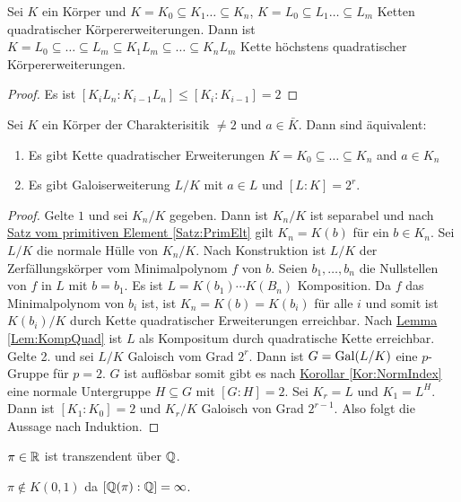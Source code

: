 \begin{Lemma}\label{Lem:KompQuad}
    Sei \(K\) ein Körper und \(K=K_0\subseteq K_1\dots\subseteq K_n\), \(K=L_0\subseteq L_1\dots\subseteq L_m\) Ketten quadratischer Körpererweiterungen.
    Dann ist \(K=L_0\subseteq \dots\subseteq L_m\subseteq K_1L_m\subseteq\dots \subseteq K_nL_m\) Kette höchstens quadratischer Körpererweiterungen.
\end{Lemma}
\begin{proof}
    Es ist \([K_iL_n:K_{i-1}L_n]\leq [K_i:K_{i-1}]=2\)
\end{proof}
\begin{Satz}
    Sei \(K\) ein Körper der Charakterisitik \(\neq 2\) und \(a\in\bar K\). Dann sind äquivalent:
    \begin{enumerate}
        \item Es gibt Kette quadratischer Erweiterungen \(K=K_0\subseteq \dots\subseteq K_n\) and \(a\in K_n\)
        \item Es gibt Galoiserweiterung \(L/K\) mit \(a\in L\) und \([L:K]=2^r\).
    \end{enumerate}
\end{Satz}
\begin{proof}
    Gelte \(1\) und sei \(K_n/K\) gegeben. Dann ist \(K_n/K\) ist separabel und nach \hyperref[Satz:PrimElt]{Satz vom primitiven Element \ref{Satz:PrimElt}} gilt \(K_n=K(b)\) für ein \(b\in K_n\). Sei \(L/K\) die normale Hülle von \(K_n/K\). Nach Konstruktion ist \(L/K\) der Zerfällungskörper vom Minimalpolynom \(f\) von \(b\). Seien \(b_1,\dots,b_n\) die Nullstellen von \(f\) in \(L\) mit \(b=b_1.\) Es ist \(L=K(b_1)\cdots K(B_n)\) Komposition. Da \(f\) das Minimalpolynom von \(b_i\) ist, ist \(K_n=K(b)=K(b_i)\) für alle \(i\) und somit ist \(K(b_i)/K\) durch Kette quadratischer Erweiterungen erreichbar. Nach \hyperref[Lem:KompQuad]{Lemma \ref{Lem:KompQuad}} ist \(L\) als Kompositum durch quadratische Kette erreichbar. Gelte 2. und sei \(L/K\) Galoisch vom Grad \(2^r\). Dann ist \(G=\operatorname{Gal}(L/K)\) eine \(p\)-Gruppe für \(p=2\).
    \(G\) ist auflösbar somit gibt es nach \hyperref[Kor:NormIndex]{Korollar \ref{Kor:NormIndex}} eine normale Untergruppe \(H\subseteq G\) mit \([G:H]=2\).
    Sei \(K_r=L\) und \(K_1=L^H\). Dann ist \([K_1:K_0]=2\) und \(K_r/K\) Galoisch von Grad \(2^{r-1}\). Also folgt die Aussage nach Induktion.
\end{proof}
\begin{Satz}
    \(\pi\in\mathbb{R}\) ist transzendent über \(\mathbb{Q}\).
\end{Satz}
\begin{Kor}
    \(\pi\not\in K(0,1)\) da \([\mathbb{Q}(\pi):\mathbb{Q}]=\infty\).
\end{Kor}
